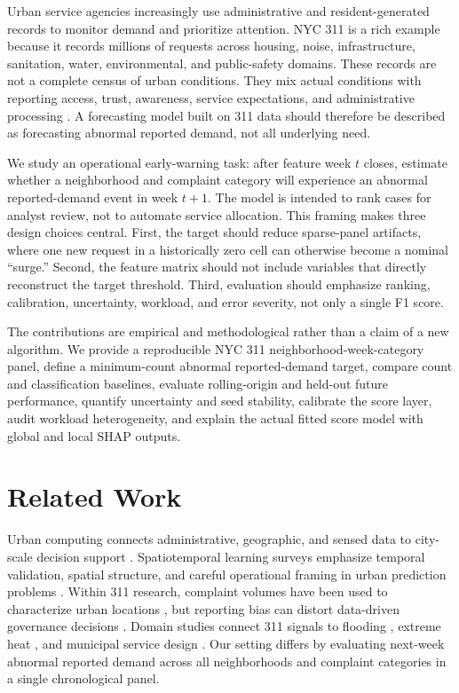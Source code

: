 \documentclass[pdflatex,sn-mathphys-num]{sn-jnl}
\begin{document}
Urban service agencies increasingly use administrative and resident-generated records to monitor demand and prioritize attention. NYC 311 is a rich example because it records millions of requests across housing, noise, infrastructure, sanitation, water, environmental, and public-safety domains. These records are not a complete census of urban conditions. They mix actual conditions with reporting access, trust, awareness, service expectations, and administrative processing \cite{Wang2017Structure311,KontokostaHong2021Bias}. A forecasting model built on 311 data should therefore be described as forecasting abnormal reported demand, not all underlying need.

We study an operational early-warning task: after feature week \(t\) closes, estimate whether a neighborhood and complaint category will experience an abnormal reported-demand event in week \(t+1\). The model is intended to rank cases for analyst review, not to automate service allocation. This framing makes three design choices central. First, the target should reduce sparse-panel artifacts, where one new request in a historically zero cell can otherwise become a nominal ``surge.'' Second, the feature matrix should not include variables that directly reconstruct the target threshold. Third, evaluation should emphasize ranking, calibration, uncertainty, workload, and error severity, not only a single F1 score.

The contributions are empirical and methodological rather than a claim of a new algorithm. We provide a reproducible NYC 311 neighborhood-week-category panel, define a minimum-count abnormal reported-demand target, compare count and classification baselines, evaluate rolling-origin and held-out future performance, quantify uncertainty and seed stability, calibrate the score layer, audit workload heterogeneity, and explain the actual fitted score model with global and local SHAP outputs.

\section{Related Work}\label{sec:related}

Urban computing connects administrative, geographic, and sensed data to city-scale decision support \cite{Zheng2014UrbanComputing}. Spatiotemporal learning surveys emphasize temporal validation, spatial structure, and careful operational framing in urban prediction problems \cite{Jin2024STGNNSurvey}. Within 311 research, complaint volumes have been used to characterize urban locations \cite{Wang2017Structure311}, but reporting bias can distort data-driven governance decisions \cite{KontokostaHong2021Bias}. Domain studies connect 311 signals to flooding \cite{Agonafir2022Flooding311}, extreme heat \cite{KianmehrPamukcu2022Heat311}, and municipal service design \cite{LiuGarg2024SLA}. Our setting differs by evaluating next-week abnormal reported demand across all neighborhoods and complaint categories in a single chronological panel.
\end{document}
